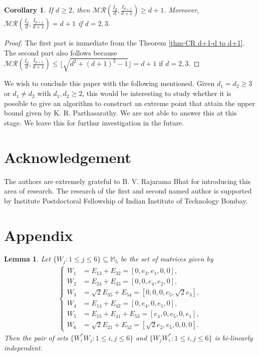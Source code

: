 \documentclass[10pt,reqno]{amsart}
\theoremstyle{definition}
\theoremstyle{plain}
\newtheorem{lem}[defn]{Lemma}
\newtheorem{cor}[defn]{Corollary}
\theoremstyle{remark}
\newcommand{\mbb}[1]{\mathbb{#1}}
\newcommand{\msc}[1]{\mathscr{#1}}
\newcommand{\M}[1]{\mbb{M}_{#1}}%
\numberwithin{equation}{section}%
\begin{document}
\begin{cor}
	If $d\geq 2$, then $\msc{MR}(\frac{I_{d}}{d},\frac{I_{d+1}}{d+1})\geq d+1$. Moreover, $\msc{MR}(\frac{I_{d}}{d},\frac{I_{d+1}}{d+1})=d+1$ if $d=2,3$.
\end{cor}

\begin{proof}
	The first part is immediate from the Theorem \ref{thm-CR d+1-d to d+1}. The second part also follows because $\msc{MR}(\frac{I_{d}}{d},\frac{I_{d+1}}{d+1})\leq \lfloor{\sqrt{d^2+(d+1)^2-1}}\rfloor=d+1$ if $d=2,3$.
\end{proof}


We wish to conclude this paper with the following mentioned. Given $d_1=d_2\geq 3$ or $d_1\neq d_2$ with $d_1,d_2\geq 2$, this would be interesting to study whether it is possible to give an algorithm to construct an extreme point that attain the upper bound given by K. R. Parthasarathy. We are not able to answer this at this stage. We leave this for furthur investigation in the future.


\section{Acknowledgement}

The authors are extremely grateful to B. V. Rajarama Bhat for introducing this area of research. The research of the first and second named author is supported by Institute Postdoctoral Fellowship of Indian Institute of Technology Bombay.



\section{Appendix}\label{appendix}


\begin{lem}\label{lem-CR-6-appendix}
	Let $\{W_j:1\leq j\leq 6\}\subseteq\M{5}$ be the set of matrices given by 
    \begin{align}\label{eq-CR-6-appendix}
		\begin{cases}
			W_1&=E_{13}+E_{32}=[0,e_3,e_1,0,0],\\
			W_2&=E_{24}+E_{43}=[0,0,e_4,e_2,0],\\
			W_3&=\sqrt{2}E_{35}+E_{54}=[0,0,0,e_5,\sqrt{2}e_3],\\
			W_4&=E_{14}+E_{42}=[0,e_4,0,e_1,0],\\
			W_5&=E_{15}+E_{41}+E_{53}=[e_4,0,e_5,0,e_1],\\
			W_6&=\sqrt{2}E_{21}+E_{52}=[\sqrt{2}e_2,e_5,0,0,0].
		\end{cases}
	\end{align}
	Then the pair of sets $\{W_i^*W_j:1\leq i,j\leq 6\}$ and $\{W_jW_i^*:1\leq i,j\leq 6\}$ is bi-linearly independent.
\end{lem}
\end{document}
